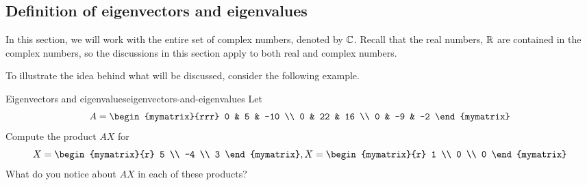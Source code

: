 \subsection{Definition of eigenvectors and eigenvalues}

In this section, we will work with the entire set of complex numbers, 
denoted by $\mathbb{C}$. Recall that the real numbers, $\mathbb{R}$ are 
contained in the complex numbers, so the discussions in this section 
apply to both real and complex numbers. 

To illustrate the idea behind what will be discussed, consider the following
example.

\begin{example}{Eigenvectors and eigenvalues}{eigenvectors-and-eigenvalues}
Let
\begin{equation*}
A = \begin{mymatrix}{rrr}
0 & 5 & -10 \\
0 & 22 & 16 \\
0 & -9 & -2
\end{mymatrix} 
\end{equation*}
Compute the product $AX$ for 
\begin{equation*}
X = \begin{mymatrix}{r}
5 \\
-4 \\
 3
\end{mymatrix}, X = \begin{mymatrix}{r}
1 \\
0 \\
0
\end{mymatrix}
\end{equation*}
What do you notice about $AX$ in each of these products? 
\end{example}

